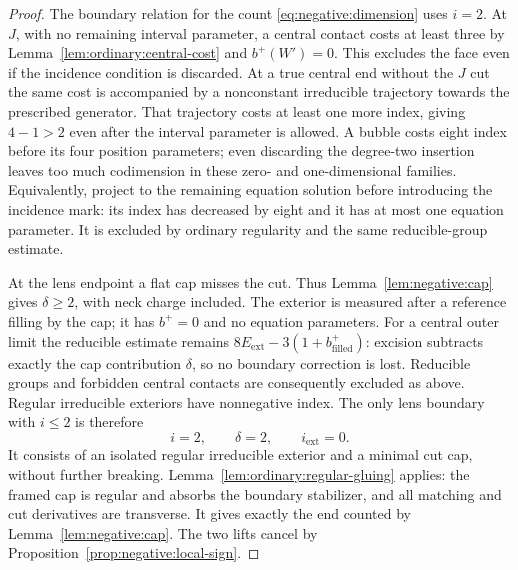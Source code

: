 \begin{proof}
The boundary relation for the count \eqref{eq:negative:dimension} uses
$i=2$.  At $J$, with no remaining interval parameter, a central contact
costs at least three by Lemma~\ref{lem:ordinary:central-cost} and
$b^+(W')=0$.  This excludes the face even if the incidence condition
is discarded.  At a true central end without the $J$ cut the same
cost is accompanied by a nonconstant irreducible trajectory towards
the prescribed generator.  That trajectory costs at least one more
index, giving $4-1>2$ even after the interval parameter is allowed.
A bubble costs eight index before its four position parameters;
even discarding the degree-two insertion leaves too much codimension
in these zero- and one-dimensional families.  Equivalently, project
to the remaining equation solution before introducing the incidence
mark: its index has decreased by eight and it has at most one
equation parameter.  It is excluded by ordinary regularity and the
same reducible-group estimate.

At the lens endpoint a flat cap misses the cut.  Thus
Lemma~\ref{lem:negative:cap} gives $\delta\ge2$, with neck charge
included.  The exterior is measured after a reference filling by the
cap; it has $b^+=0$ and no equation parameters.  For a central outer
limit the reducible estimate remains
$8E_{\mathrm{ext}}-3(1+b^+_{\mathrm{filled}})$: excision subtracts
exactly the cap contribution $\delta$, so no boundary correction is
lost.  Reducible groups and forbidden central contacts are consequently
excluded as above.  Regular irreducible exteriors have nonnegative
index.  The only lens boundary with $i\le2$ is therefore
\[
 i=2,\qquad \delta=2,\qquad i_{\mathrm{ext}}=0.
\]
It consists of an isolated regular irreducible exterior and a minimal
cut cap, without further breaking.  Lemma~\ref{lem:ordinary:regular-gluing}
applies: the framed cap is regular and absorbs the boundary stabilizer,
and all matching and cut derivatives are transverse.  It gives exactly
the end counted by Lemma~\ref{lem:negative:cap}.  The two lifts cancel
by Proposition~\ref{prop:negative:local-sign}.


\end{proof}
